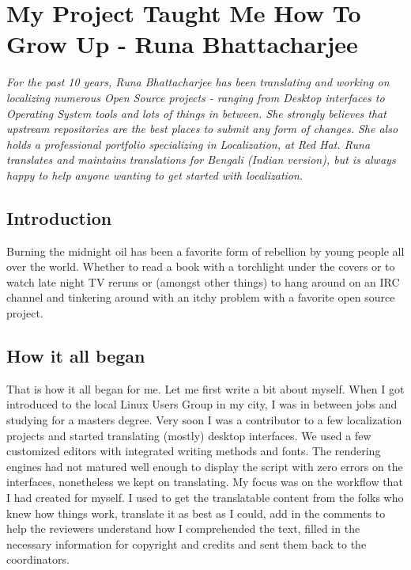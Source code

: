 \chapter{My Project Taught Me How To Grow Up - Runa Bhattacharjee}

\textit{For the past 10 years, Runa Bhattacharjee has been translating and working on
localizing numerous Open Source projects - ranging from Desktop interfaces to
Operating System tools and lots of things in between. She strongly believes that
upstream repositories are the best places to submit any form of changes. She also
holds a professional portfolio specializing in Localization, at Red Hat. Runa
translates and maintains translations for Bengali (Indian version), but is
always happy to help anyone wanting to get started with localization.}

\section*{Introduction}

Burning the midnight oil has been a favorite form of rebellion by young people
all over the world. Whether to read a book with a torchlight under the covers or
to watch late night TV reruns or (amongst other things) to hang around on an IRC
channel and tinkering around with an itchy problem with a favorite open source
project. 

\section*{How it all began}

That is how it all began for me. Let me first write a bit about myself. When I
got introduced to the local Linux Users Group in my city, I was in between jobs
and studying for a masters degree. Very soon I was a contributor to a few
localization projects and started translating (mostly) desktop interfaces. We
used a few customized editors with integrated writing methods and fonts. The
rendering engines had not matured well enough to display the script with zero
errors on the interfaces, nonetheless we kept on translating. My focus was on
the workflow that I had created for myself. I used to get the translatable
content from the folks who knew how things work, translate it as best as I
could, add in the comments to help the reviewers understand how I comprehended
the text, filled in the necessary information for copyright and credits and sent
them back to the coordinators.

